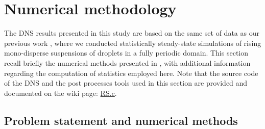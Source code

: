 \section{Numerical methodology}
\label{sec:methodo2}

The DNS results presented in this study are based on the same set of data as our previous work \citet{fintzi2024buoyancy}, where we conducted statistically steady-state simulations of rising mono-disperse suspensions of droplets in a fully periodic domain. 
This section recall briefly the numerical methods presented in \citet{fintzi2024buoyancy}, with additional information regarding the computation of statistics employed here. 
Note that the source code of the DNS and the post processes tools used in this section are provided and documented on the wiki page: \href{http://basilisk.fr/sandbox/fintzin/Rising-suspension/RS.c}{RS.c}. 



\subsection{Problem statement and numerical methods}


